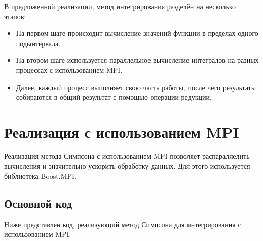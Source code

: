 \documentclass[a4paper,12pt]{article}
\begin{document}
В предложенной реализации, метод интегрирования разделён на несколько этапов:
\begin{itemize}
    \item На первом шаге происходит вычисление значений функции в пределах одного подынтервала.
    \item На втором шаге используется параллельное вычисление интегралов на разных процессах с использованием MPI.
    \item Далее, каждый процесс выполняет свою часть работы, после чего результаты собираются в общий результат с помощью операции редукции.
\end{itemize}

\section{Реализация с использованием MPI}
Реализация метода Симпсона с использованием MPI позволяет распараллелить вычисления и значительно ускорить обработку данных. Для этого используется библиотека Boost.MPI.

\subsection{Основной код}
Ниже представлен код, реализующий метод Симпсона для интегрирования с использованием MPI:
\end{document}
